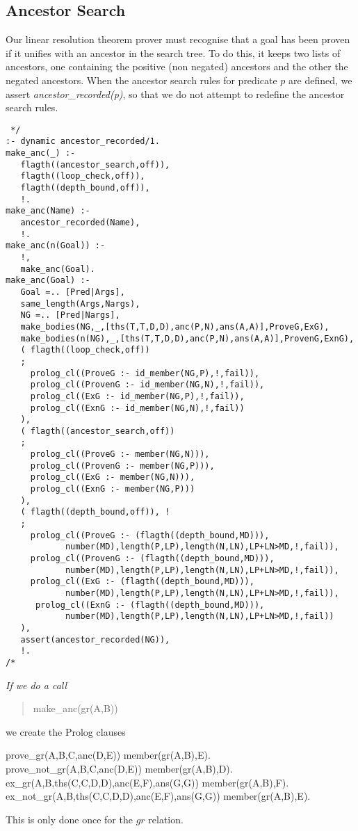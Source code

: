 \subsection{Ancestor Search} \label{anc-section}
Our linear resolution
theorem prover must recognise that a goal has been proven if
it unifies with an ancestor in the search tree. To do this, it keeps
two lists of ancestors, one containing the positive (non negated)
ancestors and the other the negated ancestors.
When the ancestor search rules for predicate $p$ are defined, we assert
{\em ancestor\_recorded(p)}, so that we do not attempt to redefine the
ancestor search rules.
\begin{verbatim} */
:- dynamic ancestor_recorded/1.
make_anc(_) :-
   flagth((ancestor_search,off)),
   flagth((loop_check,off)),
   flagth((depth_bound,off)),
   !.
make_anc(Name) :-
   ancestor_recorded(Name),
   !.
make_anc(n(Goal)) :-
   !,
   make_anc(Goal).
make_anc(Goal) :-
   Goal =.. [Pred|Args],
   same_length(Args,Nargs),
   NG =.. [Pred|Nargs],
   make_bodies(NG,_,[ths(T,T,D,D),anc(P,N),ans(A,A)],ProveG,ExG),
   make_bodies(n(NG),_,[ths(T,T,D,D),anc(P,N),ans(A,A)],ProvenG,ExnG),
   ( flagth((loop_check,off))
   ;
     prolog_cl((ProveG :- id_member(NG,P),!,fail)),
     prolog_cl((ProvenG :- id_member(NG,N),!,fail)),
     prolog_cl((ExG :- id_member(NG,P),!,fail)),
     prolog_cl((ExnG :- id_member(NG,N),!,fail))
   ),
   ( flagth((ancestor_search,off))
   ;
     prolog_cl((ProveG :- member(NG,N))),
     prolog_cl((ProvenG :- member(NG,P))),
     prolog_cl((ExG :- member(NG,N))),
     prolog_cl((ExnG :- member(NG,P)))
   ),
   ( flagth((depth_bound,off)), !
   ;
     prolog_cl((ProveG :- (flagth((depth_bound,MD))),
            number(MD),length(P,LP),length(N,LN),LP+LN>MD,!,fail)),
     prolog_cl((ProvenG :- (flagth((depth_bound,MD))),
            number(MD),length(P,LP),length(N,LN),LP+LN>MD,!,fail)),
     prolog_cl((ExG :- (flagth((depth_bound,MD))),
            number(MD),length(P,LP),length(N,LN),LP+LN>MD,!,fail)),
      prolog_cl((ExnG :- (flagth((depth_bound,MD))),
            number(MD),length(P,LP),length(N,LN),LP+LN>MD,!,fail))
   ),
   assert(ancestor_recorded(NG)),
   !.
/* \end{verbatim}

\begin{example} \em
If we do a call
\begin{quote}
make\_anc(gr(A,B))
\end{quote}
we create the Prolog clauses
\begin{prolog}
prove\_gr(A,B,C,anc(D,E))\IF
member(gr(A,B),E).\\
prove\_not\_gr(A,B,C,anc(D,E))\IF
member(gr(A,B),D).\\
ex\_gr(A,B,ths(C,C,D,D),anc(E,F),ans(G,G))\IF
member(gr(A,B),F).\\
ex\_not\_gr(A,B,ths(C,C,D,D),anc(E,F),ans(G,G))\IF
member(gr(A,B),E).
\end{prolog}
This is only done once for the $gr$ relation.
\end{example}

